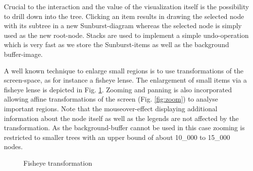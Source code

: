 \begin{itemize}
Crucial to the interaction and the value of the visualization itself is the possibility to drill down into the tree. Clicking an item results in drawing the selected node with its subtree in a new Sunburst-diagram whereas the selected node is simply used as the new root-node. Stacks are used to implement a simple undo-operation which is very fast as we store the Sunburst-items as well as the background buffer-image. 

A well known technique to enlarge small regions is to use transformations of the screen-space, as for instance a fisheye lense. The enlargement of small items via a fisheye lense is depicted in Fig. \ref{fig:fisheye}. Zooming and panning is also incorporated allowing affine transformations of the screen (Fig. \ref{fig:zoom}) to analyse important regions. Note that the mouseover-effect displaying additional information about the node itself as well as the legends are not affected by the transformation. As the background-buffer cannot be used in this case zooming is restricted to smaller trees with an upper bound of about 10\_000 to 15\_000 nodes.

\begin{figure}[tb]
\caption{\label{fig:fisheye} Fisheye transformation}
\end{figure}


\end{itemize}
